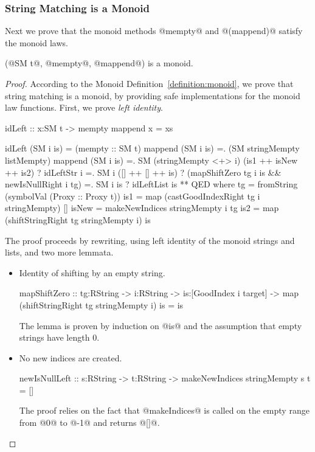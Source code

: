 \subsubsection{String Matching is a Monoid}
Next we prove that the monoid methods @mempty@ and @(mappend)@ satisfy
the monoid laws.
%
\begin{theorem}[SM is a Monoid]\label{theorem:stringmatchers}
(@SM t@, @mempty@, @mappend@)
is a monoid.
\end{theorem}
%
\begin{proof}
According to the Monoid Definition~\ref{definition:monoid},
we prove that string matching is a monoid,
by providing safe implementations for the monoid law functions.
%
First, we prove \textit{left identity}.
\begin{code}
  idLeft :: x:SM t -> {mempty mappend x = xs}
  
  idLeft (SM i is)
    =   (mempty :: SM t) mappend (SM i is)
    =. (SM stringMempty listMempty) mappend (SM i is)
    =. SM (stringMempty <+> i) (is1 ++ isNew ++ is2)
       ? idLeftStr i
    =. SM i ([] ++ [] ++ is)
       ? (mapShiftZero tg i is && newIsNullRight i tg)
    =. SM i is
       ? idLeftList is
    ** QED
    where
      tg    = fromString (symbolVal (Proxy :: Proxy t))
      is1   = map (castGoodIndexRight tg i stringMempty) []
      isNew = makeNewIndices stringMempty i tg
      is2   = map (shiftStringRight tg stringMempty i) is
\end{code}

The proof proceeds by rewriting, using left identity of the monoid strings and lists,
and two more lemmata.
\begin{itemize}
\item Identity of shifting by an empty string.
\begin{code}
  mapShiftZero :: tg:RString -> i:RString
    -> is:[GoodIndex i target]
    -> {map (shiftStringRight tg stringMempty i) is = is}
\end{code}
The lemma is proven by induction on @is@ and
the assumption that empty strings have length 0.
\item No new indices are created.
\begin{code}
  newIsNullLeft :: s:RString -> t:RString 
                -> {makeNewIndices stringMempty s t = []}
\end{code}
The proof relies on the fact that @makeIndices@
is called on the empty range from @0@ to @-1@
and returns @[]@.
\end{itemize}


\end{proof}
